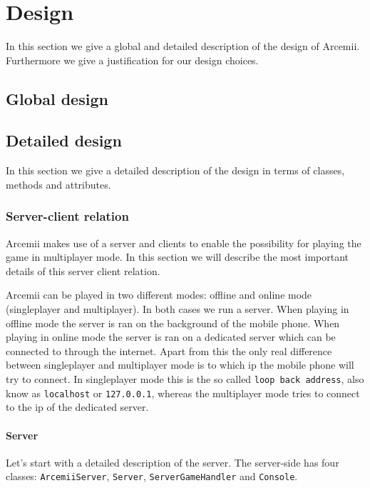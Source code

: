 \documentclass[../main.tex]{subfiles}
\begin{document}
\pagebreak

\section{Design}
In this section we give a global and detailed description of the design of Arcemii. Furthermore we give a justification for our design choices.

	\subsection{Global design}

    \pagebreak
    \subsection{Detailed design}
    In this section we give a detailed description of the design in terms of classes, methods and attributes.

        \subsubsection{Server-client relation}
        Arcemii makes use of a server and clients to enable the possibility for playing the game in multiplayer mode. In this section we will describe the most important details of this server client relation.

        Arcemii can be played in two different modes: offline and online mode (singleplayer and multiplayer). In both cases we run a server. When playing in offline mode the server is ran on the background of the mobile phone. When playing in online mode the server is ran on a dedicated server which can be connected to through the internet. Apart from this the only real difference between singleplayer and multiplayer mode is to which ip the mobile phone will try to connect. In singleplayer mode this is the so called \texttt{loop back address}, also know as \texttt{localhost} or \texttt{127.0.0.1}, whereas the multiplayer mode tries to connect to the ip of the dedicated server. 

        \paragraph{Server} 
        Let's start with a detailed description of the server. The server-side has four classes: \texttt{ArcemiiServer}, \texttt{Server}, \texttt{ServerGameHandler} and \texttt{Console}. 
        
\end{document}
